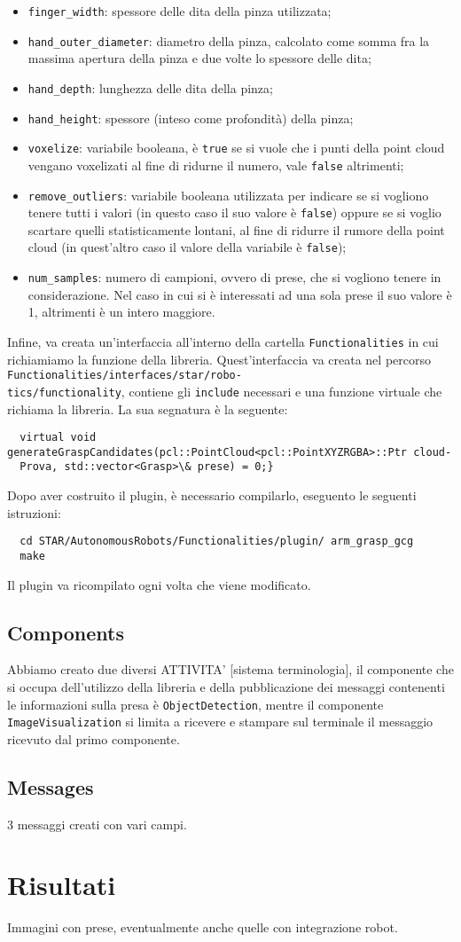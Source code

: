 \documentclass{report}
\begin{document}
\begin{itemize}
\item \texttt{finger\_width}: spessore delle dita della pinza utilizzata;
\item \texttt{hand\_outer\_diameter}: diametro della pinza, calcolato come somma fra la massima apertura della pinza e due volte lo spessore delle dita;
\item \texttt{hand\_depth}: lunghezza delle dita della pinza;
\item \texttt{hand\_height}: spessore (inteso come profondità) della pinza;
\item \texttt{voxelize}: variabile booleana, è \texttt{true} se si vuole che i punti della point cloud vengano voxelizati al fine di ridurne il numero, vale \texttt{false} altrimenti;
\item \texttt{remove\_outliers}: variabile booleana utilizzata per indicare se si vogliono tenere tutti i valori (in questo caso il suo valore è \texttt{false}) oppure se si voglio scartare quelli statisticamente lontani, al fine di ridurre il rumore della point cloud (in quest'altro caso il valore della variabile è \texttt{false});
\item \texttt{num\_samples}: numero di campioni, ovvero di prese, che si vogliono tenere in considerazione. Nel caso in cui si è interessati ad una sola prese il suo valore è 1, altrimenti è un intero maggiore.
\end{itemize}
Infine, va creata un'interfaccia all'interno della cartella \texttt{Functionalities} in cui richiamiamo la funzione della libreria. Quest'interfaccia va creata nel percorso \texttt{Functionalities/interfaces/star/robo-}\\\texttt{tics/functionality}, contiene gli \texttt{include} necessari e una funzione virtuale che richiama la libreria. La sua segnatura è la seguente:
\begin{verbatim}
  virtual void generateGraspCandidates(pcl::PointCloud<pcl::PointXYZRGBA>::Ptr cloud-
  Prova, std::vector<Grasp>\& prese) = 0;}
\end{verbatim} 
Dopo aver costruito il plugin, è necessario compilarlo, eseguento le seguenti istruzioni:
\begin{verbatim}
  cd STAR/AutonomousRobots/Functionalities/plugin/ arm_grasp_gcg
  make
\end{verbatim} 
Il plugin va ricompilato ogni volta che viene modificato. 
\section{Components}
Abbiamo creato due diversi ATTIVITA' [sistema terminologia], il componente che si occupa dell'utilizzo della libreria e della pubblicazione dei messaggi contenenti le informazioni sulla presa è \texttt{ObjectDetection}, mentre il componente \texttt{ImageVisualization} si limita a ricevere e stampare sul terminale il messaggio ricevuto dal primo componente.
\section{Messages}
3 messaggi creati con vari campi.

\newpage
\chapter{Risultati}\label{risultati}
Immagini con prese, eventualmente anche quelle con integrazione robot.
\end{document}
